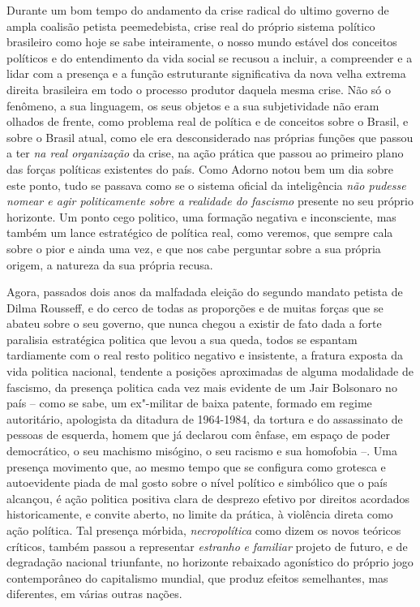 Durante um bom tempo do andamento da crise radical do ultimo governo de
ampla coalisão petista peemedebista, crise real do próprio sistema
político brasileiro como hoje se sabe inteiramente, o nosso mundo
estável dos conceitos políticos e do entendimento da vida social se
recusou a incluir, a compreender e a lidar com a presença e a função
estruturante significativa da nova velha extrema direita brasileira em
todo o processo produtor daquela mesma crise. Não só o fenômeno, a sua
linguagem, os seus objetos e a sua subjetividade não eram olhados de
frente, como problema real de política e de conceitos sobre o Brasil, e
sobre o Brasil atual, como ele era desconsiderado nas próprias funções
que passou a ter \emph{na real organização} da crise, na ação prática
que passou ao primeiro plano das forças políticas existentes do país.
Como Adorno notou bem um dia sobre este ponto, tudo se passava como se o
sistema oficial da inteligência \emph{não pudesse nomear e agir
politicamente sobre a realidade do fascismo} presente no seu próprio
horizonte. Um ponto cego politico, uma formação negativa e inconsciente,
mas também um lance estratégico de política real, como veremos, que
sempre cala sobre o pior e ainda uma vez, e que nos cabe perguntar sobre
a sua própria origem, a natureza da sua própria recusa.

Agora, passados dois anos da malfadada eleição do segundo mandato
petista de Dilma Rousseff, e do cerco de todas as proporções e de muitas
forças que se abateu sobre o seu governo, que nunca chegou a existir de
fato dada a forte paralisia estratégica politica que levou a sua queda,
todos se espantam tardiamente com o real resto politico negativo e
insistente, a fratura exposta da vida politica nacional, tendente a
posições aproximadas de alguma modalidade de fascismo, da presença
politica cada vez mais evidente de um Jair Bolsonaro no país -- como se
sabe, um ex"-militar de baixa patente, formado em regime autoritário,
apologista da ditadura de 1964-1984, da tortura e do assassinato de
pessoas de esquerda, homem que já declarou com ênfase, em espaço de
poder democrático, o seu machismo misógino, o seu racismo e sua
homofobia --. Uma presença movimento que, ao mesmo tempo que se
configura como grotesca e autoevidente piada de mal gosto sobre o nível
político e simbólico que o país alcançou, é ação politica positiva clara
de desprezo efetivo por direitos acordados historicamente, e convite
aberto, no limite da prática, à violência direta como ação política. Tal
presença mórbida, \emph{necropolítica} como dizem os novos teóricos
críticos, também passou a representar \emph{estranho} \emph{e}
\emph{familiar} projeto de futuro, e de degradação nacional triunfante,
no horizonte rebaixado agonístico do próprio jogo contemporâneo do
capitalismo mundial, que produz efeitos semelhantes, mas diferentes, em
várias outras nações.

